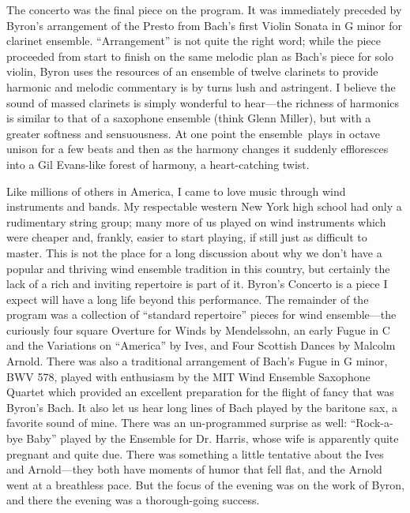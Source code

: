 The concerto was the final piece on the program. It was immediately preceded by Byron’s arrangement of the Presto from Bach’s first Violin Sonata in G minor for clarinet ensemble. “Arrangement” is not quite the right word; while the piece proceeded from start to finish on the same melodic plan as Bach’s piece for solo violin, Byron uses the resources of an ensemble of twelve clarinets to provide harmonic and melodic commentary is by turns lush and astringent. I believe the sound of massed clarinets is simply wonderful to hear—the richness of harmonics is similar to that of a saxophone ensemble (think Glenn Miller), but with a greater softness and sensuousness. At one point the ensemble plays in octave unison for a few beats and then as the harmony changes it suddenly effloresces into a Gil Evans-like forest of harmony, a heart-catching twist.

Like millions of others in America, I came to love music through wind instruments and bands. My respectable western New York high school had only a rudimentary string group; many more of us played on wind instruments which were cheaper and, frankly, easier to start playing, if still just as difficult to master. This is not the place for a long discussion about why we don’t have a popular and thriving wind ensemble tradition in this country, but certainly the lack of a rich and inviting repertoire is part of it. Byron’s Concerto is a piece I expect will have a long life beyond this performance. The remainder of the program was a collection of “standard repertoire” pieces for wind ensemble—the curiously four square Overture for Winds by Mendelssohn, an early Fugue in C and the Variations on “America” by Ives, and Four Scottish Dances by Malcolm Arnold. There was also a traditional arrangement of Bach’s Fugue in G minor, BWV 578, played with enthusiasm by the MIT Wind Ensemble Saxophone Quartet which provided an excellent preparation for the flight of fancy that was Byron’s Bach. It also let us hear long lines of Bach played by the baritone sax, a favorite sound of mine. There was an un-programmed surprise as well: “Rock-a-bye Baby” played by the Ensemble for Dr. Harris, whose wife is apparently quite pregnant and quite due. There was something a little tentative about the Ives and Arnold—they both have moments of humor that fell flat, and the Arnold went at a breathless pace. But the focus of the evening was on the work of Byron, and there the evening was a thorough-going success.

